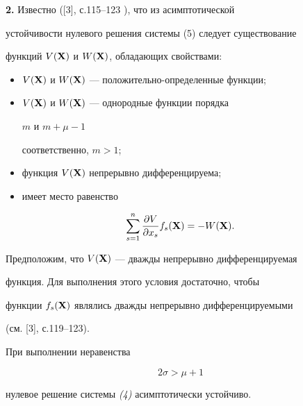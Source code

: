  


{\bf 2.} Известно ([3], с.115--123 ), что из асимптотической 


устойчивости нулевого решения системы (5) следует существование 


функций $V(\bold X)$ и $W(\bold X)$, обладающих свойствами: 


\begin{itemize} 


\item[1)] $V(\bold X)$ и $W(\bold X)$ --- положительно-определенные функции; 


\item[2)] $V(\bold X)$ и $W(\bold X)$ --- однородные функции порядка 


$m$ и $m+\mu-1$ 


соответственно, $m>1$; 


\item[3)] функция $V(\bold X)$ непрерывно дифференцируема; 


\item[4)] имеет место равенство 


\end{itemize} 


$$ 


\sum^n_{s=1}\frac{\partial V}{\partial x_s}f_s(\bx)= 


-W(\bx). 


$$ 


 


Предположим, что $V(\bold X)$ --- дважды непрерывно дифференцируемая 


функция. Для выполнения этого условия достаточно, чтобы 


функции $f_s(\bold X)$ являлись дважды непрерывно дифференцируемыми 


(см. [3], с.119--123). 


 


\begin{thm} При выполнении неравенства 


\begin{equation} 


2\sigma>\mu+1 


\end{equation} 


нулевое решение системы {\em (4)} асимптотически устойчиво. 


\end{thm} 


